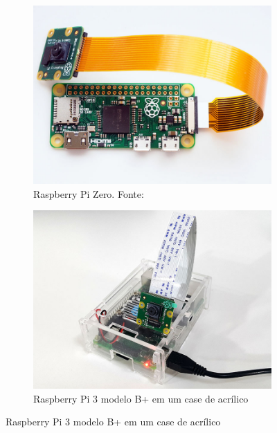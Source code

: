 \begin{figure}[htbp]
    \centering
    \caption{Raspberry Pis com câmera}
    \label{fig:raspberry}
    \begin{subfigure}[t]{0.49\textwidth}
    \centering
    \includegraphics[width=0.95\linewidth]{imagens/raspberry_zero.jpg}
    \caption{Raspberry Pi Zero. Fonte: \cite{upton2016zero}} \label{fig:raspberry:a}
    \end{subfigure}
    \begin{subfigure}[t]{0.49\textwidth}
    \centering
    \includegraphics[width=0.95\linewidth]{imagens/raspberry.jpg}
    \caption{Raspberry Pi 3 modelo B+ em um case de acrílico} \label{fig:raspberry:b}
    \end{subfigure}
\end{figure}

